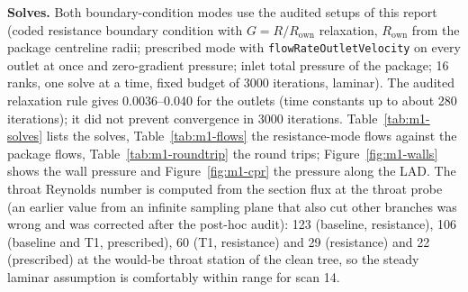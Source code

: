 \documentclass[11pt]{article}
\begin{document}
\textbf{Solves.} Both boundary-condition modes use the audited setups of this report (coded resistance boundary condition with $G=R/R_\text{own}$ relaxation, $R_\text{own}$ from the package centreline radii; prescribed mode with \texttt{flowRateOutletVelocity} on every outlet at once and zero-gradient pressure; inlet total pressure of the package; 16 ranks, one solve at a time, fixed budget of 3000 iterations, laminar). The audited relaxation rule gives 0.0036--0.040 for the outlets (time constants up to about 280 iterations); it did not prevent convergence in 3000 iterations. Table~\ref{tab:m1-solves} lists the solves, Table~\ref{tab:m1-flows} the resistance-mode flows against the package flows, Table~\ref{tab:m1-roundtrip} the round trips; Figure~\ref{fig:m1-walls} shows the wall pressure and Figure~\ref{fig:m1-cpr} the pressure along the LAD. The throat Reynolds number is computed from the section flux at the throat probe (an earlier value from an infinite sampling plane that also cut other branches was wrong and was corrected after the post-hoc audit): 123 (baseline, resistance), 106 (baseline and T1, prescribed), 60 (T1, resistance) and 29 (resistance) and 22 (prescribed) at the would-be throat station of the clean tree, so the steady laminar assumption is comfortably within range for scan 14.

\begin{table}[H]
\centering
\caption{Scan-14 Gate-M1 solves (16 ranks each, one at a time, fixed budget 3000 iterations, strict verdict as stated; the throat Reynolds number is the section flux at the throat probe, at the would-be throat station for the clean tree).}
\label{tab:m1-solves}
\small
{}
\end{table}
\end{document}
